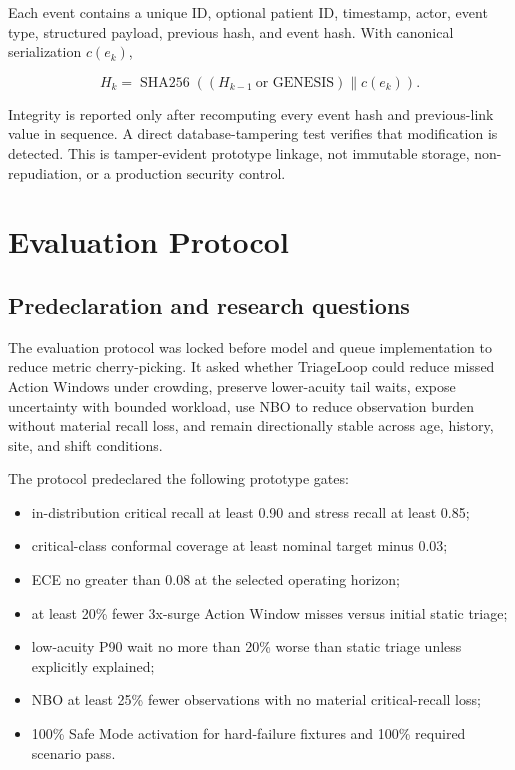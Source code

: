 \documentclass[11pt,a4paper]{article}
\begin{document}
Each event contains a unique ID, optional patient ID, timestamp, actor, event type, structured payload, previous hash, and event hash. With canonical serialization $c(e_k)$,

\begin{equation}
H_k=\operatorname{SHA256}\left((H_{k-1}\ \text{or GENESIS})\parallel c(e_k)\right).
\end{equation}

Integrity is reported only after recomputing every event hash and previous-link value in sequence. A direct database-tampering test verifies that modification is detected. This is tamper-evident prototype linkage, not immutable storage, non-repudiation, or a production security control.

\section{Evaluation Protocol}

\subsection{Predeclaration and research questions}

The evaluation protocol was locked before model and queue implementation to reduce metric cherry-picking. It asked whether TriageLoop could reduce missed Action Windows under crowding, preserve lower-acuity tail waits, expose uncertainty with bounded workload, use NBO to reduce observation burden without material recall loss, and remain directionally stable across age, history, site, and shift conditions.

The protocol predeclared the following prototype gates:

\begin{itemize}
  \item in-distribution critical recall at least 0.90 and stress recall at least 0.85;
  \item critical-class conformal coverage at least nominal target minus 0.03;
  \item ECE no greater than 0.08 at the selected operating horizon;
  \item at least 20\% fewer 3x-surge Action Window misses versus initial static triage;
  \item low-acuity P90 wait no more than 20\% worse than static triage unless explicitly explained;
  \item NBO at least 25\% fewer observations with no material critical-recall loss;
  \item 100\% Safe Mode activation for hard-failure fixtures and 100\% required scenario pass.
\end{itemize}
\end{document}
